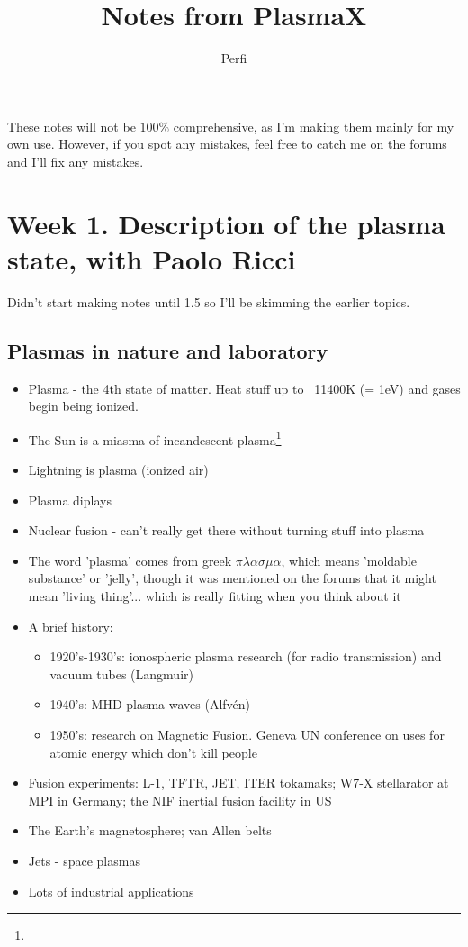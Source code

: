 
\usepackage[utf8]{inputenc}
\usepackage{graphicx}
\title{Notes from PlasmaX}
\author{Perfi}


\maketitle

These notes will not be $100\%$ comprehensive, as I'm making them mainly for my own use. However, if you spot any mistakes, feel free to catch me on the forums and I'll fix any mistakes. 

\section{Week 1. Description of the plasma state, with Paolo Ricci}
Didn't start making notes until 1.5 so I'll be skimming the earlier topics.
	\subsection{Plasmas in nature and laboratory}
		\begin{itemize}
			\item Plasma - the 4th state of matter. Heat stuff up to ~11400K (= 1eV) and gases begin being ionized.
			\item The Sun is a miasma of incandescent plasma\footnote{}
			\item Lightning is plasma (ionized air)
			\item Plasma diplays
			\item Nuclear fusion - can't really get there without turning stuff into plasma
			\item The word 'plasma' comes from greek $\pi\lambda\alpha\sigma\mu\alpha$, which means 'moldable substance' or 'jelly', though it was mentioned on the forums that it might mean 'living thing'... which is really fitting when you think about it
			\item A brief history:
				\begin{itemize}
					\item 1920's-1930's: ionospheric plasma research (for radio transmission) and vacuum tubes (Langmuir)
					\item 1940's: MHD plasma waves (Alfvén)
					\item 1950's: research on Magnetic Fusion. Geneva UN conference on uses for atomic energy which don't kill people
				\end{itemize}
			\item Fusion experiments: L-1, TFTR, JET, ITER tokamaks; W7-X stellarator at MPI in Germany; the NIF inertial fusion facility in US
			\item The Earth's magnetosphere; van Allen belts
			\item Jets - space plasmas
			\item Lots of industrial applications
		\end{itemize}
		
